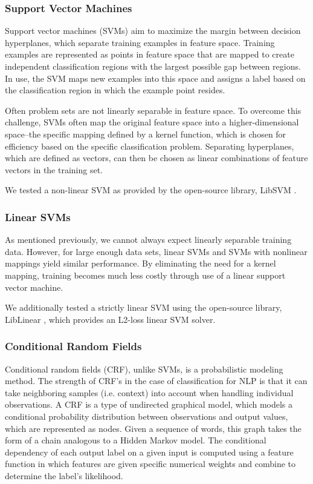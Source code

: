 \documentclass[preprint]{style}
\begin{document}
\subsubsection{Support Vector Machines}
Support vector machines (SVMs) aim to maximize the margin between decision hyperplanes, which separate training examples in feature space. Training examples are represented as points in feature space that are mapped to create independent classification regions with the largest possible gap between regions. In use, the SVM maps new examples into this space and assigns a label based on the classification region in which the example point resides. 

Often problem sets are not linearly separable in feature space. To overcome this challenge, SVMs often map the original feature space into a higher-dimensional space--the specific mapping defined by a kernel function, which is chosen for efficiency based on the specific classification problem. Separating hyperplanes, which are defined as vectors, can then be chosen as linear combinations of feature vectors in the training set.

We tested a non-linear SVM as provided by the open-source library, LibSVM \cite{libsvm}.

\subsubsection{Linear SVMs}
As mentioned previously, we cannot always expect linearly separable training data. However, for large enough data sets, linear SVMs and SVMs with nonlinear mappings yield similar performance. By eliminating the need for a kernel mapping, training becomes much less costly through use of a linear support vector machine. 

We additionally tested a strictly linear SVM using the open-source library, LibLinear \cite{liblinear}, which provides an L2-loss linear SVM solver.

\subsubsection{Conditional Random Fields}
Conditional random fields (CRF), unlike SVMs, is a probabilistic modeling method. The strength of CRF's in the case of classification for NLP is that it can take neighboring samples (i.e. context) into account when handling individual observations. A CRF is a type of undirected graphical model, which models a conditional probability distribution between observations and output values, which are represented as nodes. Given a sequence of words, this graph takes the form of a chain analogous to a Hidden Markov model. The conditional dependency of each output label on a given input is computed using a feature function in which features are given specific numerical weights and combine to determine the label's likelihood. 
\end{document}
